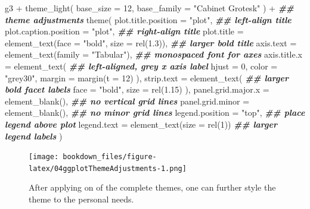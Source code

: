 \documentclass[
]{krantz}
\makeatletter
\newenvironment{Shaded}{\begin{snugshade}}{\end{snugshade}}
\newcommand{\AttributeTok}[1]{\textcolor[rgb]{0.61,0.61,0.61}{#1}}
\newcommand{\DecValTok}[1]{\textcolor[rgb]{0.06,0.06,0.06}{#1}}
\newcommand{\DocumentationTok}[1]{\textcolor[rgb]{0.37,0.37,0.37}{\textbf{\textit{#1}}}}
\newcommand{\FloatTok}[1]{\textcolor[rgb]{0.06,0.06,0.06}{#1}}
\newcommand{\FunctionTok}[1]{\textcolor[rgb]{0,0,0}{#1}}
\newcommand{\NormalTok}[1]{#1}
\newcommand{\SpecialCharTok}[1]{\textcolor[rgb]{0,0,0}{#1}}
\newcommand{\StringTok}[1]{\textcolor[rgb]{0.5,0.5,0.5}{#1}}
\newenvironment{kframe}{%
\medskip{}
\setlength{\fboxsep}{.8em}
 \def\at@end@of@kframe{}%
 \ifinner\ifhmode%
  \def\at@end@of@kframe{\end{minipage}}%
  \begin{minipage}{\columnwidth}%
 \fi\fi%
 \def\FrameCommand##1{\hskip\@totalleftmargin \hskip-\fboxsep
 \colorbox{shadecolor}{##1}\hskip-\fboxsep
     \hskip-\linewidth \hskip-\@totalleftmargin \hskip\columnwidth}%
 \MakeFramed {\advance\hsize-\width
   \@totalleftmargin\z@ \linewidth\hsize
   \@setminipage}}%
 {\par\unskip\endMakeFramed%
 \at@end@of@kframe}
\renewenvironment{Shaded}{\begin{kframe}}{\end{kframe}}
\makeatother
\begin{document}
\begin{Shaded}
\begin{Highlighting}[]
\NormalTok{g3 }\SpecialCharTok{+}
  \FunctionTok{theme\_light}\NormalTok{(}
    \AttributeTok{base\_size =} \DecValTok{12}\NormalTok{, }\AttributeTok{base\_family =} \StringTok{"Cabinet Grotesk"}
\NormalTok{  ) }\SpecialCharTok{+}
  \DocumentationTok{\#\# theme adjustments}
  \FunctionTok{theme}\NormalTok{(}
    \AttributeTok{plot.title.position =} \StringTok{"plot"}\NormalTok{, }\DocumentationTok{\#\# left{-}align title}
    \AttributeTok{plot.caption.position =} \StringTok{"plot"}\NormalTok{, }\DocumentationTok{\#\# right{-}align title}
    \AttributeTok{plot.title =} \FunctionTok{element\_text}\NormalTok{(}\AttributeTok{face =} \StringTok{"bold"}\NormalTok{, }\AttributeTok{size =} \FunctionTok{rel}\NormalTok{(}\FloatTok{1.3}\NormalTok{)), }\DocumentationTok{\#\# larger bold title}
    \AttributeTok{axis.text =} \FunctionTok{element\_text}\NormalTok{(}\AttributeTok{family =} \StringTok{"Tabular"}\NormalTok{), }\DocumentationTok{\#\# monospaced font for axes}
    \AttributeTok{axis.title.x =} \FunctionTok{element\_text}\NormalTok{( }\DocumentationTok{\#\# left{-}aligned, grey x axis label}
      \AttributeTok{hjust =} \DecValTok{0}\NormalTok{, }\AttributeTok{color =} \StringTok{"grey30"}\NormalTok{, }\AttributeTok{margin =} \FunctionTok{margin}\NormalTok{(}\AttributeTok{t =} \DecValTok{12}\NormalTok{)}
\NormalTok{    ),}
    \AttributeTok{strip.text =} \FunctionTok{element\_text}\NormalTok{( }\DocumentationTok{\#\# larger bold facet labels}
      \AttributeTok{face =} \StringTok{"bold"}\NormalTok{, }\AttributeTok{size =} \FunctionTok{rel}\NormalTok{(}\FloatTok{1.15}\NormalTok{)}
\NormalTok{    ),}
    \AttributeTok{panel.grid.major.x =} \FunctionTok{element\_blank}\NormalTok{(), }\DocumentationTok{\#\# no vertical grid lines}
    \AttributeTok{panel.grid.minor =} \FunctionTok{element\_blank}\NormalTok{(), }\DocumentationTok{\#\# no minor grid lines}
    \AttributeTok{legend.position =} \StringTok{"top"}\NormalTok{, }\DocumentationTok{\#\# place legend above plot}
    \AttributeTok{legend.text =} \FunctionTok{element\_text}\NormalTok{(}\AttributeTok{size =} \FunctionTok{rel}\NormalTok{(}\DecValTok{1}\NormalTok{)) }\DocumentationTok{\#\# larger legend labels}
\NormalTok{  )}
\end{Highlighting}
\end{Shaded}

\begin{figure}
\centering
\texttt{[image: bookdown\_files/figure-latex/04ggplotThemeAdjustments-1.png]}
\caption{\label{fig:04ggplotThemeAdjustments}After applying on of the complete themes, one can further style the theme to the personal needs.}
\end{figure}
\end{document}
